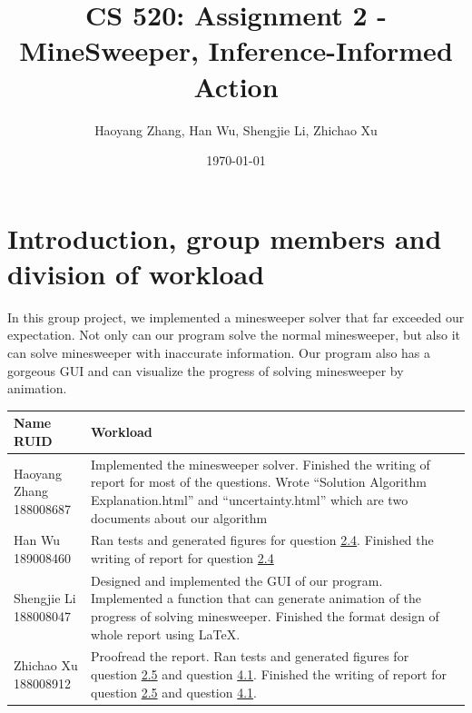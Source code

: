 \documentclass[letter]{article}
\title{CS 520: Assignment 2 - MineSweeper, Inference-Informed Action}
\author{Haoyang Zhang, Han Wu, Shengjie Li, Zhichao Xu}
\date{\today}
\begin{document}
\maketitle

\section{Introduction, group members and division of workload}
\label{sec:Introduction}

In this group project, we implemented a minesweeper solver that far exceeded our expectation. Not only can our program solve the normal minesweeper, but also it can solve minesweeper with inaccurate information. Our program also has a gorgeous GUI and can visualize the progress of solving minesweeper by animation. \\
\begin{tabular}{| p{2.5cm} | p{\textwidth -3.5cm} |}
	\hline
	\makecell[c]{Name \\ RUID} & Workload \\
	\hline
	\makecell[c]{Haoyang Zhang \\ 188008687} & {Implemented the minesweeper solver. Finished the writing of report for most of the questions. Wrote ``Solution Algorithm Explanation.html'' and ``uncertainty.html'' which are two documents about our algorithm} \\
	\hline
	\makecell[c]{Han Wu \\ 189008460} & {Ran tests and generated figures for question \hyperref[han]{2.4}. Finished the writing of report for question \hyperref[han]{2.4}} \\
	\hline
	\makecell[c]{Shengjie Li \\ 188008047} & {Designed and implemented the GUI of our program. Implemented a function that can generate animation of the progress of solving minesweeper. Finished the format design of whole report using \LaTeX. } \\
	\hline
	\makecell[c]{Zhichao Xu \\ 188008912} & {Proofread the report. Ran tests and generated figures for question \hyperref[zhichao1]{2.5} and question \hyperref[zhichao2]{4.1}. Finished the writing of report for question \hyperref[zhichao1]{2.5} and question \hyperref[zhichao2]{4.1}.} \\
	\hline
\end{tabular}
\end{document}
